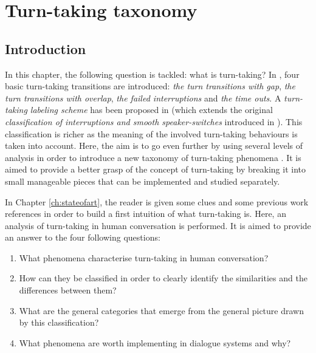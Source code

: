\chapter{Turn-taking taxonomy}
\label{ch:taxonomy}

\section{Introduction}

				In this chapter, the following question is tackled: what is turn-taking? In \cite{Raux2009}, four basic turn-taking transitions are introduced: \textit{the turn transitions with gap}, \textit{the turn transitions with overlap}, \textit{the failed interruptions} and \textit{the time outs}. A \textit{turn-taking labeling scheme} has been proposed in \cite{Gravano2011} (which extends the original \textit{classification of interruptions and smooth speaker-switches} introduced in \cite{Beattie1982}). This classification is richer as the meaning of the involved turn-taking behaviours is taken into account. Here, the aim is to go even further by using several levels of analysis in order to introduce a new taxonomy of turn-taking phenomena \cite{Khouzaimi2015c}. It is aimed to provide a better grasp of the concept of turn-taking by breaking it into small manageable pieces that can be implemented and studied separately.
				
				In Chapter \ref{ch:stateofart}, the reader is given some clues and some previous work references in order to build a first intuition of what turn-taking is. Here, an analysis of turn-taking in human conversation is performed. It is aimed to provide an answer to the four following questions:

        \begin{enumerate}
          \item What phenomena characterise turn-taking in human conversation?
          \item How can they be classified in order to clearly identify the similarities and the differences between them?
          \item What are the general categories that emerge from the general picture drawn by this classification?
          \item What phenomena are worth implementing in dialogue systems and why?
        \end{enumerate}

